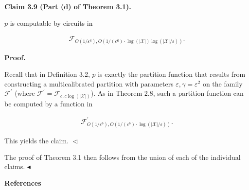 

\par\medskip\noindent\textbf{
Claim 3.9 (Part (d) of Theorem 3.1). 
}\par



$p$ is computable by circuits in\par


\[\begin{gathered}
\mathcal{F}_{O(1/\varepsilon^{6}),O(1/(\varepsilon^{6})\cdot\log(|\mathcal{X}|)\log(|\mathcal{X}|/\varepsilon))}.
\end{gathered}\]







\par\medskip\noindent\textbf{
\textbf{Proof}.}\par




Recall that in Definition 3.2, $p$ is exactly the partition function that results from constructing a multicalibrated partition with parameters $\varepsilon,\gamma=\varepsilon^{2}$ on the family $\mathcal{F}^{\prime}$ (where $\mathcal{F}^{\prime}=\mathcal{F}_{c,c\log(|\mathcal{X}|)}$). As in Theorem 2.8, such a partition function can be computed by a function in\par


\[\begin{gathered}
\mathcal{F}^{\prime}_{O(1/\varepsilon^{6}),O(1/(\varepsilon^{6})\cdot\log(|\mathcal{X}|/\varepsilon))}.
\end{gathered}\]


This yields the claim.
$\vartriangleleft$\par




The proof of Theorem 3.1 then follows from the union of each of the individual claims.
$\blacktriangleleft$\par







\par\medskip\noindent\textbf{References}\par




